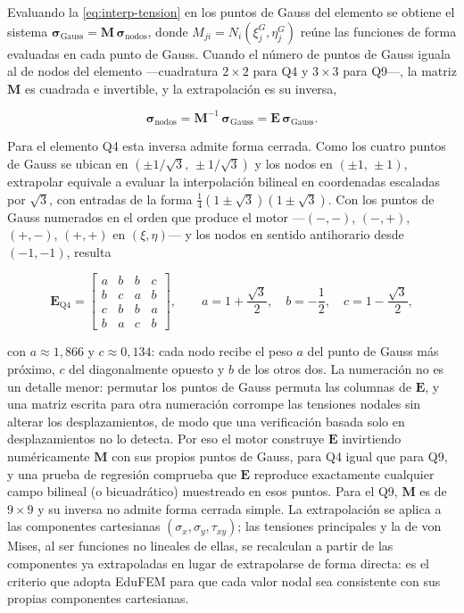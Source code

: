 Evaluando la \autoref{eq:interp-tension} en los puntos de Gauss del elemento se obtiene el sistema $\bm{\sigma}_{\text{Gauss}} = \bm{M}\,\bm{\sigma}_{\text{nodos}}$, donde $M_{ji} = N_i(\xi_j^{G},\eta_j^{G})$ reúne las funciones de forma evaluadas en cada punto de Gauss. Cuando el número de puntos de Gauss iguala al de nodos del elemento —cuadratura $2\times2$ para Q4 y $3\times3$ para Q9—, la matriz $\bm{M}$ es cuadrada e invertible, y la extrapolación es su inversa,

\begin{equation}
\bm{\sigma}_{\text{nodos}} = \bm{M}^{-1}\,\bm{\sigma}_{\text{Gauss}} = \bm{E}\,\bm{\sigma}_{\text{Gauss}}.
\label{eq:extrap-inversa}
\end{equation}

Para el elemento Q4 esta inversa admite forma cerrada. Como los cuatro puntos de Gauss se ubican en $(\pm 1/\sqrt{3},\,\pm 1/\sqrt{3})$ y los nodos en $(\pm 1,\,\pm 1)$, extrapolar equivale a evaluar la interpolación bilineal en coordenadas escaladas por $\sqrt{3}$, con entradas de la forma $\tfrac{1}{4}(1\pm\sqrt{3})(1\pm\sqrt{3})$. Con los puntos de Gauss numerados en el orden que produce el motor —$(-,-)$, $(-,+)$, $(+,-)$, $(+,+)$ en $(\xi,\eta)$— y los nodos en sentido antihorario desde $(-1,-1)$, resulta

\begin{equation}
\bm{E}_{\text{Q4}} =
\begin{bmatrix}
a & b & b & c \\
b & c & a & b \\
c & b & b & a \\
b & a & c & b
\end{bmatrix},
\qquad
a = 1+\frac{\sqrt{3}}{2},\quad
b = -\frac{1}{2},\quad
c = 1-\frac{\sqrt{3}}{2},
\label{eq:extrap-q4}
\end{equation}

con $a \approx 1{,}866$ y $c \approx 0{,}134$: cada nodo recibe el peso $a$ del punto de Gauss más próximo, $c$ del diagonalmente opuesto y $b$ de los otros dos. La numeración no es un detalle menor: permutar los puntos de Gauss permuta las columnas de $\bm{E}$, y una matriz escrita para otra numeración corrompe las tensiones nodales sin alterar los desplazamientos, de modo que una verificación basada solo en desplazamientos no lo detecta. Por eso el motor construye $\bm{E}$ invirtiendo numéricamente $\bm{M}$ con sus propios puntos de Gauss, para Q4 igual que para Q9, y una prueba de regresión comprueba que $\bm{E}$ reproduce exactamente cualquier campo bilineal (o bicuadrático) muestreado en esos puntos. Para el Q9, $\bm{M}$ es de $9\times9$ y su inversa no admite forma cerrada simple. La extrapolación se aplica a las componentes cartesianas $(\sigma_x,\sigma_y,\tau_{xy})$; las tensiones principales y la de von Mises, al ser funciones no lineales de ellas, se recalculan a partir de las componentes ya extrapoladas en lugar de extrapolarse de forma directa: es el criterio que adopta EduFEM para que cada valor nodal sea consistente con sus propias componentes cartesianas.


